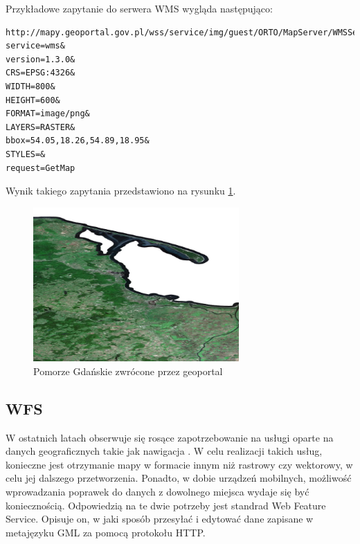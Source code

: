Przykładowe zapytanie do serwera WMS wygląda następująco: 

\begin{lstlisting}[frame=single]
http://mapy.geoportal.gov.pl/wss/service/img/guest/ORTO/MapServer/WMSServer?
service=wms&
version=1.3.0&
CRS=EPSG:4326&
WIDTH=800&
HEIGHT=600&
FORMAT=image/png&
LAYERS=RASTER&
bbox=54.05,18.26,54.89,18.95&
STYLES=&
request=GetMap
\end{lstlisting}

Wynik takiego zapytania przedstawiono na rysunku \ref{fig:pomorze_gdanskie}.

\begin{figure}[h!]
    \centering
    \includegraphics[width=0.7\textwidth]{img/pomorze_gdanskie.png}
    \caption{Pomorze Gdańskie zwrócone przez geoportal}
    \label{fig:pomorze_gdanskie}
\end{figure}

\subsection{WFS}

W ostatnich latach obserwuje się rosące zapotrzebowanie na usługi oparte na danych geograficznych takie jak nawigacja \cite{TRZEBA_COS_ZNALEZC}.
W celu realizacji takich usług, konieczne jest otrzymanie mapy w formacie innym niż rastrowy czy wektorowy, w celu jej dalszego przetworzenia.
Ponadto, w dobie urządzeń mobilnych, możliwość wprowadzania poprawek do danych z dowolnego miejsca wydaje się być koniecznością.
Odpowiedzią na te dwie potrzeby jest standrad Web Feature Service.
Opisuje on, w jaki sposób przesyłać i edytować dane zapisane w metajęzyku GML za pomocą protokołu HTTP.

